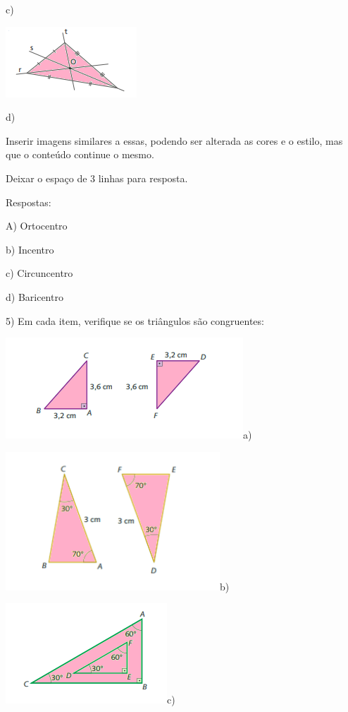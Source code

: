 {c)

\includegraphics[width=1.9375in,height=1.04167in]{./imgSAEB_8_MAT/media/image18.png}

d)

Inserir imagens similares a essas, podendo ser alterada as cores e o
estilo, mas que o conteúdo continue o mesmo.

Deixar o espaço de 3 linhas para resposta.

Respostas:

A) Ortocentro

b) Incentro

c) Circuncentro

d) Baricentro

5) Em cada item, verifique se os triângulos são congruentes:

\includegraphics[width=3.51042in,height=1.48958in]{./imgSAEB_8_MAT/media/image19.png}a)

\includegraphics[width=3.16667in,height=2.03958in]{./imgSAEB_8_MAT/media/image20.png}b)

\includegraphics[width=2.38542in,height=1.47917in]{./imgSAEB_8_MAT/media/image21.png}c)

}
